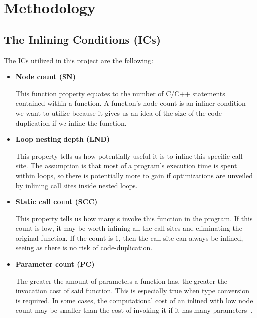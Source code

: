 
\clearpage
\section{Methodology}
\label{sec:methodology}


\subsection{The Inlining Conditions (ICs)}
\label{sub:meth:inlining_conditions}

The ICs utilized in this project are the following:

\begin{itemize}

	\item \textbf{Node count (SN)}

This function property equates to the number of C/C++ statements contained
within a function. A function's node count is an inliner condition we want
to utilize because it gives us an idea of the size of the code-duplication if we
inline the function.

	\item \textbf{Loop nesting depth (LND)}

This property tells us how potentially useful it is to inline this specific call
site. The assumption is that most of a program's execution time is spent within
loops, so there is potentially more to gain if optimizations are unveiled by
inlining call sites inside nested loops.

	\item \textbf{Static call count (SCC)}

This property tells us how many \applyNode s invoke this function in the
program. If this count is low, it may be worth inlining all the call sites and
eliminating the original function. If the count is $1$, then the call site can
always be inlined, seeing as there is no risk of code-duplication.

	\item \textbf{Parameter count (PC)}

The greater the amount of parameters a function has, the greater the invocation
cost of said function. This is especially true when type conversion is required.
In some cases, the computational cost of an inlined with low node count may
be smaller than the cost of invoking it if it has many
parameters~\cite{AdaptvCompilAndInlingWaterman}.


\end{itemize}
